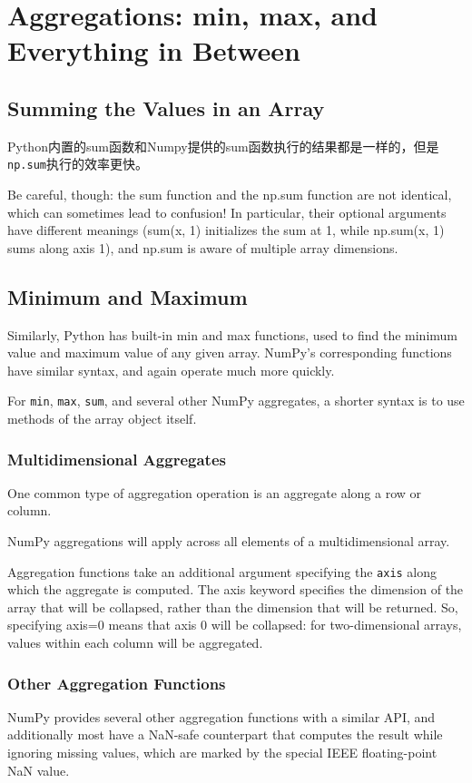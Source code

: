 \chapter{Aggregations: min, max, and Everything in Between\label{Ch07}}
\section{Summing the Values in an Array}

Python内置的sum函数和Numpy提供的sum函数执行的结果都是一样的，但是\verb|np.sum|执行的效率更快。

Be careful, though: the sum function and the np.sum function are not identical, which
can sometimes lead to confusion! In particular, their optional arguments have different meanings (sum(x, 1) initializes the sum at 1, while np.sum(x, 1) sums along
axis 1), and np.sum is aware of multiple array dimensions.

\section{Minimum and Maximum}
Similarly, Python has built-in min and max functions, used to find the minimum value
and maximum value of any given array. NumPy's corresponding functions have similar syntax, and again operate much more
quickly.

For \verb|min|, \verb|max|, \verb|sum|, and several other NumPy aggregates, a shorter syntax is to use
methods of the array object itself.

\subsection{Multidimensional Aggregates}
One common type of aggregation operation is an aggregate along a row or column.

NumPy aggregations will apply across all elements of a multidimensional array.

Aggregation functions take an additional argument specifying the \verb|axis| along which
the aggregate is computed. The axis keyword specifies the dimension of the array that will be collapsed,
rather than the dimension that will be returned. So, specifying axis=0 means that axis
0 will be collapsed: for two-dimensional arrays, values within each column will be
aggregated.

\subsection{Other Aggregation Functions}
NumPy provides several other aggregation functions with a similar API, and additionally most have a NaN-safe counterpart that computes the result while ignoring
missing values, which are marked by the special IEEE floating-point NaN value.

